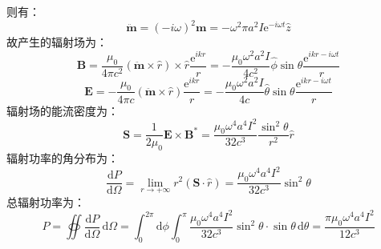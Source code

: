 \documentclass[a4paper,fontset=none]{ctexart}
\begin{document}
\begin{itemize}
        则有：
        \[
            \ddot{\bm{m}} = (-i\omega)^2\bm{m} = -\omega^2\pi a^2I\mathrm{e}^{-i\omega t}\hat{z}
        \]
        故产生的辐射场为：
        \[
            \bm{B} = \frac{\mu_0}{4\pi c^2}(\ddot{\bm{m}} \times \hat{r}) \times \hat{r} \frac{\mathrm{e}^{ikr}}{r} = -\frac{\mu_0\omega^2a^2I}{4c^2}\hat{\phi}\sin\theta\frac{\mathrm{e}^{ikr-i\omega t}}{r}
        \]
        \[
            \bm{E} = -\frac{\mu_0}{4\pi c}(\ddot{\bm{m}} \times \hat{r}) \frac{\mathrm{e}^{ikr}}{r} = -\frac{\mu_0\omega^2a^2I}{4c}\hat{\theta}\sin\theta\frac{\mathrm{e}^{ikr-i\omega t}}{r}
        \]
        辐射场的能流密度为：
        \[
            \bm{S} = \frac{1}{2\mu_0}\bm{E} \times \bm{B}^* = \frac{\mu_0\omega^4a^4I^2}{32c^3}\frac{\sin^2\theta}{r^2}\hat{r}
        \]
        辐射功率的角分布为：
        \[
            \frac{\mathrm{d}P}{\mathrm{d}\varOmega} = \lim_{r\to+\infty} r^2(\bm{S} \cdot \hat{r}) = \frac{\mu_0\omega^4a^4I^2}{32c^3}\sin^2\theta
        \]
        总辐射功率为：
        \[
            P = \oiint \frac{\mathrm{d}P}{\mathrm{d}\varOmega}\,\mathrm{d}\varOmega = \int_0^{2\pi} \mathrm{d}\phi \int_0^\pi \frac{\mu_0\omega^4a^4I^2}{32c^3}\sin^2\theta \cdot \sin\theta\,\mathrm{d}\theta = \frac{\pi\mu_0\omega^4a^4I^2}{12c^3}
        \]

    \end{itemize}
\end{document}
